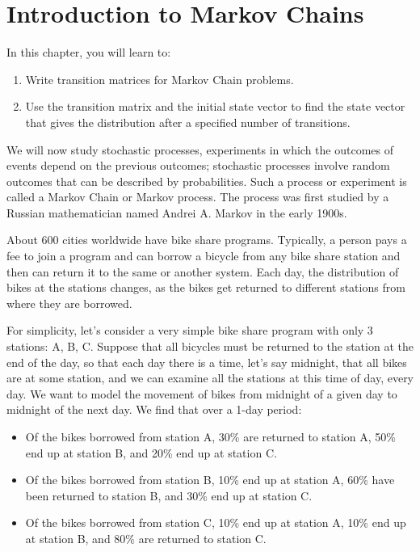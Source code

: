 \section{Introduction to Markov Chains}\label{section_markov_chains}
In this chapter, you will learn to:
\begin{enumerate}
    \item Write transition matrices for Markov Chain problems.
    \item Use the transition matrix and the initial state vector to find the state vector that gives the distribution after a specified number of transitions.
\end{enumerate}

We will now study stochastic processes, experiments in which the outcomes of events depend on the previous outcomes; stochastic processes involve random outcomes that can be described by probabilities. Such a process or experiment is called a Markov Chain or Markov process. The process was first studied by a Russian mathematician named Andrei A. Markov in the early 1900s.

About 600 cities worldwide have bike share programs. Typically, a person pays a fee to join a program and can borrow a bicycle from any bike share station and then can return it to the same or another system. Each day, the distribution of bikes at the stations changes, as the bikes get returned to different stations from where they are borrowed.

For simplicity, let’s consider a very simple bike share program with only 3 stations: A, B, C. Suppose that all bicycles must be returned to the station at the end of the day, so that each day there is a time, let’s say midnight, that all bikes are at some station, and we can examine all the stations at this time of day, every day. We want to model the movement of bikes from midnight of a given day to midnight of the next day. We find that over a 1-day period:

\begin{itemize}
    \item Of the bikes borrowed from station A, 30\% are returned to station A, 50\% end up at station B, and 20\% end up at station C.
    \item Of the bikes borrowed from station B, 10\% end up at station A, 60\% have been returned to station B, and 30\% end up at station C.
    \item Of the bikes borrowed from station C, 10\% end up at station A, 10\% end up at station B, and 80\% are returned to station C.
\end{itemize}

